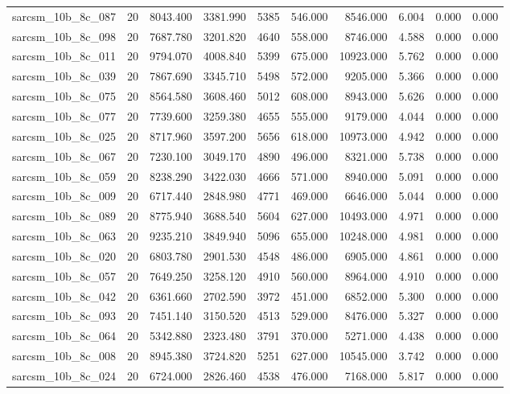 \begin{tabular}{lrrrrrrrrr}
sarcsm\_10b\_8c\_087 & 20 & 8043.400 & 3381.990 & 5385 & 546.000 & 8546.000 & 6.004 & 0.000 & 0.000 \\
sarcsm\_10b\_8c\_098 & 20 & 7687.780 & 3201.820 & 4640 & 558.000 & 8746.000 & 4.588 & 0.000 & 0.000 \\
sarcsm\_10b\_8c\_011 & 20 & 9794.070 & 4008.840 & 5399 & 675.000 & 10923.000 & 5.762 & 0.000 & 0.000 \\
sarcsm\_10b\_8c\_039 & 20 & 7867.690 & 3345.710 & 5498 & 572.000 & 9205.000 & 5.366 & 0.000 & 0.000 \\
sarcsm\_10b\_8c\_075 & 20 & 8564.580 & 3608.460 & 5012 & 608.000 & 8943.000 & 5.626 & 0.000 & 0.000 \\
sarcsm\_10b\_8c\_077 & 20 & 7739.600 & 3259.380 & 4655 & 555.000 & 9179.000 & 4.044 & 0.000 & 0.000 \\
sarcsm\_10b\_8c\_025 & 20 & 8717.960 & 3597.200 & 5656 & 618.000 & 10973.000 & 4.942 & 0.000 & 0.000 \\
sarcsm\_10b\_8c\_067 & 20 & 7230.100 & 3049.170 & 4890 & 496.000 & 8321.000 & 5.738 & 0.000 & 0.000 \\
sarcsm\_10b\_8c\_059 & 20 & 8238.290 & 3422.030 & 4666 & 571.000 & 8940.000 & 5.091 & 0.000 & 0.000 \\
sarcsm\_10b\_8c\_009 & 20 & 6717.440 & 2848.980 & 4771 & 469.000 & 6646.000 & 5.044 & 0.000 & 0.000 \\
sarcsm\_10b\_8c\_089 & 20 & 8775.940 & 3688.540 & 5604 & 627.000 & 10493.000 & 4.971 & 0.000 & 0.000 \\
sarcsm\_10b\_8c\_063 & 20 & 9235.210 & 3849.940 & 5096 & 655.000 & 10248.000 & 4.981 & 0.000 & 0.000 \\
sarcsm\_10b\_8c\_020 & 20 & 6803.780 & 2901.530 & 4548 & 486.000 & 6905.000 & 4.861 & 0.000 & 0.000 \\
sarcsm\_10b\_8c\_057 & 20 & 7649.250 & 3258.120 & 4910 & 560.000 & 8964.000 & 4.910 & 0.000 & 0.000 \\
sarcsm\_10b\_8c\_042 & 20 & 6361.660 & 2702.590 & 3972 & 451.000 & 6852.000 & 5.300 & 0.000 & 0.000 \\
sarcsm\_10b\_8c\_093 & 20 & 7451.140 & 3150.520 & 4513 & 529.000 & 8476.000 & 5.327 & 0.000 & 0.000 \\
sarcsm\_10b\_8c\_064 & 20 & 5342.880 & 2323.480 & 3791 & 370.000 & 5271.000 & 4.438 & 0.000 & 0.000 \\
sarcsm\_10b\_8c\_008 & 20 & 8945.380 & 3724.820 & 5251 & 627.000 & 10545.000 & 3.742 & 0.000 & 0.000 \\
sarcsm\_10b\_8c\_024 & 20 & 6724.000 & 2826.460 & 4538 & 476.000 & 7168.000 & 5.817 & 0.000 & 0.000 \\

\end{tabular}
